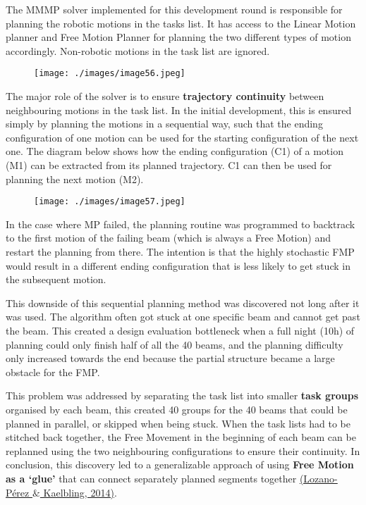 The MMMP solver implemented for this development round is responsible for planning the robotic motions in the tasks list. It has access to the Linear Motion planner and Free Motion Planner for planning the two different types of motion accordingly. Non-robotic motions in the task list are ignored.

\begin{figure}[H]
\texttt{[image: ./images/image56.jpeg]}
\end{figure}


The major role of the solver is to ensure \textbf{trajectory continuity} between neighbouring motions in the task list. In the initial development, this is ensured simply by planning the motions in a sequential way, such that the ending configuration of one motion can be used for the starting configuration of the next one. The diagram below shows how the ending configuration (C1) of a motion (M1) can be extracted from its planned trajectory. C1 can then be used for planning the next motion (M2).

\begin{figure}[H]
\texttt{[image: ./images/image57.jpeg]}
\end{figure}


In the case where MP failed, the planning routine was programmed to backtrack to the first motion of the failing beam (which is always a Free Motion) and restart the planning from there. The intention is that the highly stochastic FMP would result in a different ending configuration that is less likely to get stuck in the subsequent motion.

This downside of this sequential planning method was discovered not long after it was used. The algorithm often got stuck at one specific beam and cannot get past the beam. This created a design evaluation bottleneck when a full night (10h) of planning could only finish half of all the 40 beams, and the planning difficulty only increased towards the end because the partial structure became a large obstacle for the FMP.

This problem was addressed by separating the task list into smaller \textbf{task groups }organised by each beam, this created 40 groups for the 40 beams that could be planned in parallel, or skipped when being stuck. When the task lists had to be stitched back together, the Free Movement in the beginning of each beam can be replanned using the two neighbouring configurations to ensure their continuity. In conclusion, this discovery led to a generalizable approach of using \textbf{Free Motion as a ‘glue’} that can connect separately planned segments together \href{https://www.zotero.org/google-docs/?PykTOl}{(Lozano-Pérez $\&$ Kaelbling, 2014)}.

